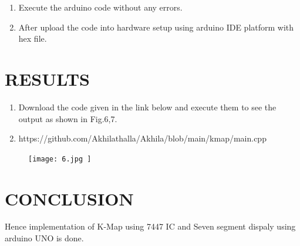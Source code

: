 \documentclass[conference]{IEEEtran}
\begin{document}
\begin{enumerate}
\item Execute the arduino code without any errors.
\item After upload the code into hardware setup using arduino IDE platform with hex file.
 \end{enumerate}
\newpage
\section{RESULTS}
 \begin{enumerate}
	 \item Download the code given in the link below and execute them to see the output as shown in Fig.6,7. 
	 \item https://github.com/Akhilathalla/Akhila/blob/main/kmap/main.cpp                                            
 \end{enumerate}


\begin{figure}[h]                           
\centering                                 
\texttt{[image: 6.jpg   ]}                                           
\caption{\label{fig-5:Gates}}               
\end{figure}

\section{CONCLUSION}
 Hence implementation of K-Map using 7447 IC and Seven segment dispaly using arduino UNO is done.
\end{document}
